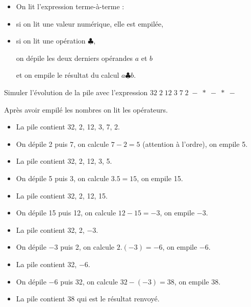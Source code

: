 \begin{itemize}
\item On lit l'expression terme-à-terme :

\item si on lit une valeur numérique, elle est empilée, 

\item si on lit une opération $\clubsuit$, 

on dépile les deux derniers opérandes $a$ et $b$ 

et on empile le résultat du calcul $a \clubsuit b$.
\end{itemize}	
\begin{Exercise}[title = {Un exemple}]\it

Simuler l'évolution de la pile avec l'expression $32\;  2\;  12\;  3\;  7\;  2\;  -\;  *\;  -\;  *\;  -$
\end{Exercise} 
\begin{Answer}
Après avoir empilé les nombres on lit les opérateurs.
\begin{itemize}
\item La pile contient 32, 2, 12, 3, 7, 2.
\item On dépile 2 puis 7, on calcule $7-2=5$ (attention à l'ordre), on empile 5.
\item La pile contient 32, 2, 12, 3, 5.
\item On dépile 5 puis 3, on calcule $3.5=15$, on empile 15.
\item La pile contient 32, 2, 12, 15.
\item On dépile 15 puis 12, on calcule $12-15=-3$, on empile $-3$.
\item La pile contient 32, 2, $-3$.
\item On dépile $-3$ puis 2, on calcule $2.(-3)=-6$, on empile $-6$.
\item La pile contient 32, $-6$.
\item On dépile $-6$ puis 32, on calcule $32-(-3)=38$, on empile $38$.
\item La pile contient 38 qui est le résultat renvoyé.
\end{itemize}
\end{Answer}%
